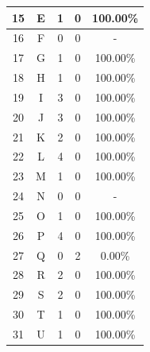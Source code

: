 \begin{longtable}[c]{|c|c|c|c|c|}
	15           & E                 & 1                       & 0                       &100.00\%            \\ \hline
	16           & F                 & 0                       & 0                       & -            \\ \hline
	17           & G                 & 1                       & 0                       &100.00\%            \\ \hline
	18           & H                 & 1                       & 0                       &100.00\%            \\ \hline
	19           & I                 & 3                       & 0                       &100.00\%            \\ \hline
	20           & J                 & 3                       & 0                       &100.00\%            \\ \hline
	21           & K                 & 2                       & 0                       &100.00\%            \\ \hline
	22           & L                 & 4                       & 0                       &100.00\%            \\ \hline
	23           & M                 & 1                       & 0                       &100.00\%            \\ \hline
	24           & N                 & 0                       & 0                       & -            \\ \hline
	25           & O                 & 1                       & 0                       &100.00\%            \\ \hline
	26           & P                 & 4                       & 0                       &100.00\%            \\ \hline
	27           & Q                 & 0                       & 2                       &0.00\%            \\ \hline
	28           & R                 & 2                       & 0                       &100.00\%            \\ \hline
	29           & S                 & 2                       & 0                       &100.00\%            \\ \hline
	30           & T                 & 1                       & 0                       &100.00\%            \\ \hline
	31           & U                 & 1                       & 0                       &100.00\%            \\ \hline

\end{longtable}

